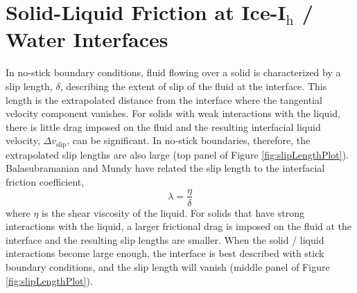 


\section{Solid-Liquid Friction at Ice-I$_\mathrm{h}$ / Water Interfaces}
In no-stick boundary conditions, fluid flowing over a solid is
characterized by a slip length, $\delta$, describing the extent of
slip of the fluid at the interface. This length is the extrapolated
distance from the interface where the tangential velocity component
vanishes. For solids with weak interactions with the liquid, there is
little drag imposed on the fluid and the resulting interfacial liquid
velocity, $\Delta v_\mathrm{slip}$, can be significant. In no-stick
boundaries, therefore, the extrapolated slip lengths are also large
(top panel of Figure \ref{fig:slipLengthPlot}).  Balasubramanian and
Mundy have related the slip length to the interfacial friction
coefficient, 
\begin{equation}\label{eq:kappa1}
\lambda = \frac{\eta}{\delta}
\end{equation}
where $\eta$ is the shear viscosity of the
liquid.\cite{Balasubramanian1999} For solids that have strong
interactions with the liquid, a larger frictional drag is imposed on
the fluid at the interface and the resulting slip lengths are
smaller. When the solid / liquid interactions become large enough, the
interface is best described with stick boundary conditions, and the
slip length will vanish (middle panel of
Figure \ref{fig:slipLengthPlot}).


